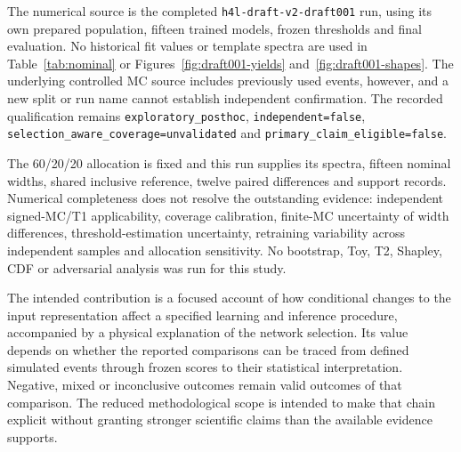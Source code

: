 \documentclass[aps,prd,reprint,superscriptaddress,nofootinbib,longbibliography,floatfix]{revtex4-2}
\begin{document}
The numerical source is the completed \nolinkurl{h4l-draft-v2-draft001} run, using
its own prepared population, fifteen trained models, frozen thresholds and final
evaluation. No historical fit values or template spectra are used in Table~\ref{tab:nominal} or
Figures~\ref{fig:draft001-yields} and~\ref{fig:draft001-shapes}. The underlying
controlled MC source includes previously used events, however, and a new split or
run name cannot establish independent confirmation. The recorded qualification
remains \nolinkurl{exploratory_posthoc}, \nolinkurl{independent=false},
\nolinkurl{selection_aware_coverage=unvalidated} and
\nolinkurl{primary_claim_eligible=false}.

The 60/20/20 allocation is fixed and this run supplies its spectra, fifteen
nominal widths, shared inclusive reference, twelve paired differences and support
records. Numerical completeness does not resolve the outstanding evidence:
independent signed-MC/T1 applicability, coverage calibration, finite-MC uncertainty
of width differences, threshold-estimation uncertainty, retraining variability
across independent samples and allocation sensitivity. No bootstrap, Toy, T2,
Shapley, CDF or adversarial analysis was run for this study.

The intended contribution is a focused account of how conditional changes to the input
representation affect a specified learning and inference procedure, accompanied by a
physical explanation of the network selection. Its value depends on whether the reported
comparisons can be traced from defined simulated events through frozen scores to their
statistical interpretation. Negative, mixed or inconclusive outcomes remain valid outcomes
of that comparison. The reduced methodological scope is intended to make that chain explicit
without granting stronger scientific claims than the available evidence supports.
\end{document}
